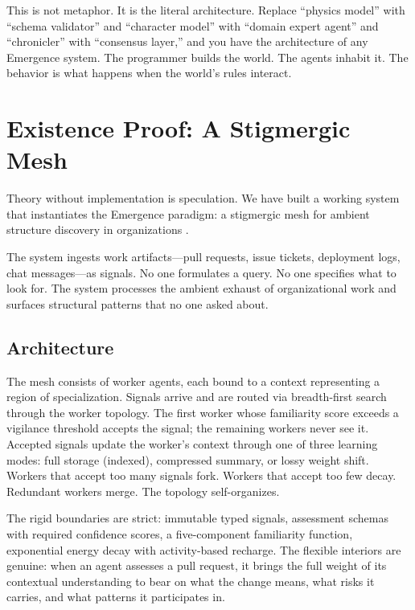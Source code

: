 \documentclass[11pt,twocolumn]{article}
\begin{document}
This is not metaphor.  It is the literal architecture.  Replace
``physics model'' with ``schema validator'' and ``character model'' with
``domain expert agent'' and ``chronicler'' with ``consensus layer,'' and
you have the architecture of any Emergence system.  The programmer
builds the world.  The agents inhabit it.  The behavior is what happens
when the world's rules interact.

\section{Existence Proof: A Stigmergic Mesh}
\label{sec:proof}

Theory without implementation is speculation.  We have built a working
system that instantiates the Emergence paradigm: a stigmergic mesh for
ambient structure discovery in organizations
\citep{mcentire2026asd}.

The system ingests work artifacts---pull requests, issue tickets,
deployment logs, chat messages---as signals.  No one formulates a query.
No one specifies what to look for.  The system processes the ambient
exhaust of organizational work and surfaces structural patterns that no
one asked about.

\subsection{Architecture}

The mesh consists of worker agents, each bound to a context representing
a region of specialization.  Signals arrive and are routed via
breadth-first search through the worker topology.  The first worker
whose familiarity score exceeds a vigilance threshold accepts the
signal; the remaining workers never see it.  Accepted signals update the
worker's context through one of three learning modes: full storage
(indexed), compressed summary, or lossy weight shift.  Workers that
accept too many signals fork.  Workers that accept too few decay.
Redundant workers merge.  The topology self-organizes.

The rigid boundaries are strict: immutable typed signals, assessment
schemas with required confidence scores, a five-component familiarity
function, exponential energy decay with activity-based recharge.  The
flexible interiors are genuine: when an agent assesses a pull request, it
brings the full weight of its contextual understanding to bear on what
the change means, what risks it carries, and what patterns it
participates in.
\end{document}
